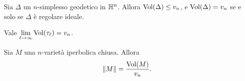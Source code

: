 \begin{theorem}
Sia $\Delta$ un $n$-simplesso geodetico in $\mathbb{H}^n$. Allora $\operatorname{Vol}(\Delta)\le v_n$, e $\operatorname{Vol}(\Delta)=v_n$ se e solo se $\Delta$ è regolare ideale.
\end{theorem}

\begin{theorem}
Vale $\lim\limits_{\ell\to\infty}\operatorname{Vol}(\tau_\ell)=v_n$.
\end{theorem}

\begin{proposition}
Sia $M$ una $n$-varietà iperbolica chiusa. Allora
\[
\left\lVert M\right\rVert=\frac{\operatorname{Vol}(M)}{v_n}.
\]
\end{proposition}
